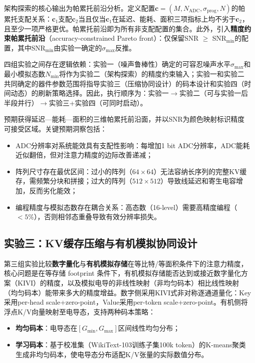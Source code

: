 架构探索的核心输出为帕累托前沿分析。定义配置$\mathbf{c} = (M, N_{\text{ADC}}, \sigma_{\text{prog}}, N)$的帕累托支配关系：$\mathbf{c}_1$支配$\mathbf{c}_2$当且仅当$\mathbf{c}_1$在延迟、能耗、面积三项指标上均不劣于$\mathbf{c}_2$，且至少一项严格更优。帕累托前沿即为所有非支配配置的集合。此外，引入\textbf{精度约束帕累托前沿}（accuracy-constrained Pareto front）：仅保留SNR $\geq$ SNR$_{\text{min}}$的配置，其中SNR$_{\text{min}}$由实验一确定的$\sigma_{\text{max}}$反推。

四组实验之间存在逻辑依赖：实验一（噪声鲁棒性）确定的可容忍噪声水平$\sigma_{\text{max}}$和最小模拟态数$N_{\text{min}}$将作为实验二（架构探索）的精度约束输入；实验一和实验二共同确定的器件参数范围将指导实验三（压缩协同设计）的码本设计和实验四（时间动态）的刷新策略选择。因此，执行顺序为：实验一$\rightarrow$实验二（可与实验一后半段并行）$\rightarrow$实验三+实验四（可同时启动）。

预期获得延迟—能耗—面积的三维帕累托前沿面，并以SNR为颜色映射标识精度可接受区域。关键预期洞察包括：

\begin{itemize}
    \item ADC分辨率对系统能效具有支配性影响：每增加1 bit ADC分辨率，ADC能耗近似翻倍，但对注意力精度的边际改善递减；
    \item 阵列尺寸存在最优区间：过小的阵列（$64\times64$）无法容纳长序列的完整KV缓存，需频繁分块和拼接；过大的阵列（$512\times512$）导致线延迟和寄生电容增加，反而劣化能效；
    \item 编程精度与模拟态数存在耦合关系：高态数（16-level）需要高精度编程（$<5\%$），否则相邻态重叠导致有效分辨率损失。
\end{itemize}

\subsection{实验三：KV缓存压缩与有机模拟协同设计}
\label{sec:exp3_compression}

第三组实验比较\textbf{数字量化}与\textbf{有机模拟存储}在等比特/等面积条件下的注意力精度，核心问题是在等存储 footprint 条件下，有机模拟存储能否达到或接近数字量化方案（KIVI）的精度，以及模拟电导的非线性映射（非均匀码本）相比线性映射（均匀码本）能带来多大的精度增益。数字侧采用KIVI式非对称逐通道量化：Key采用per-head scale+zero-point，Value采用per-token scale+zero-point。有机侧将浮点K/V向量映射至电导态，支持两种码本策略：

\begin{itemize}
    \item \textbf{均匀码本}：电导态在$[G_{\min}, G_{\max}]$区间线性均匀分布；
    \item \textbf{学习码本}：基于校准集（WikiText-103训练子集100k token）的K-means聚类生成非均匀码本，使电导态分布适配K/V张量的实际数值分布。
\end{itemize}

